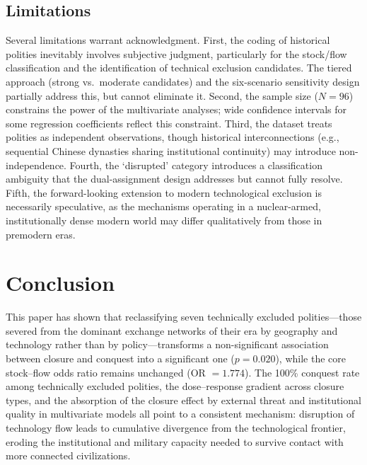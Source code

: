 \documentclass[pdflatex,sn-basic]{sn-jnl}
\theoremstyle{thmstyleone}%
\theoremstyle{thmstyletwo}%
\theoremstyle{thmstylethree}%
\begin{document}
\subsection{Limitations}\label{sec:disc-limitations}

Several limitations warrant acknowledgment. First, the coding of historical polities inevitably involves subjective judgment, particularly for the stock/flow classification and the identification of technical exclusion candidates. The tiered approach (strong vs.\ moderate candidates) and the six-scenario sensitivity design partially address this, but cannot eliminate it. Second, the sample size ($N = 96$) constrains the power of the multivariate analyses; wide confidence intervals for some regression coefficients reflect this constraint. Third, the dataset treats polities as independent observations, though historical interconnections (e.g., sequential Chinese dynasties sharing institutional continuity) may introduce non-independence. Fourth, the `disrupted' category introduces a classification ambiguity that the dual-assignment design addresses but cannot fully resolve. Fifth, the forward-looking extension to modern technological exclusion is necessarily speculative, as the mechanisms operating in a nuclear-armed, institutionally dense modern world may differ qualitatively from those in premodern eras.

\section{Conclusion}\label{sec:conclusion}

This paper has shown that reclassifying seven technically excluded polities---those severed from the dominant exchange networks of their era by geography and technology rather than by policy---transforms a non-significant association between closure and conquest into a significant one ($p = 0.020$), while the core stock--flow odds ratio remains unchanged (OR $= 1.774$). The 100\% conquest rate among technically excluded polities, the dose--response gradient across closure types, and the absorption of the closure effect by external threat and institutional quality in multivariate models all point to a consistent mechanism: disruption of technology flow leads to cumulative divergence from the technological frontier, eroding the institutional and military capacity needed to survive contact with more connected civilizations.
\end{document}
